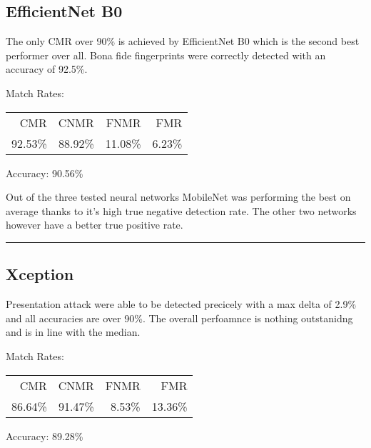 \subsection{EfficientNet B0}
\begin{minipage}[c]{0.7\textwidth}

    The only CMR over 90\% is achieved by EfficientNet B0 which is the second best performer over all.
    Bona fide fingerprints were correctly detected with an accuracy of 92.5\%.
    
    \medskip\centering Match Rates: 
    \begin{tabular}{ r  r  r  r |}
        CMR     & CNMR          & FNMR                 & FMR     \\
        92.53\% & 88.92\%       & 11.08\%              & 6.23\%  \\
    \end{tabular} \hspace{2mm} Accuracy: 90.56\%
\end{minipage}
\hfill
\begin{minipage}[c]{0.3\textwidth}
    \centering
    
\end{minipage}

\medskip
Out of the three tested neural networks MobileNet was performing the best on average thanks to it's high true negative detection rate.
The other two networks however have a better true positive rate.
\bigskip\hrule



\subsection{Xception}
\begin{minipage}[c]{0.7\textwidth}
    Presentation attack were able to be detected precicely with a max delta of 2.9\% and all accuracies are over 90\%.
    The overall perfoamnce is nothing outstanidng and is in line with the median.

    \medskip\centering Match Rates: 
    \begin{tabular}{ r  r  r  r |}
        CMR       & CNMR      & FNMR     & FMR     \\
        86.64\%   & 91.47\%   & 8.53\%   & 13.36\%  \\
    \end{tabular} \hspace{2mm} Accuracy: 89.28\%
\end{minipage}
\hfill
\begin{minipage}[c]{0.3\textwidth}
    \centering
    
\end{minipage}



